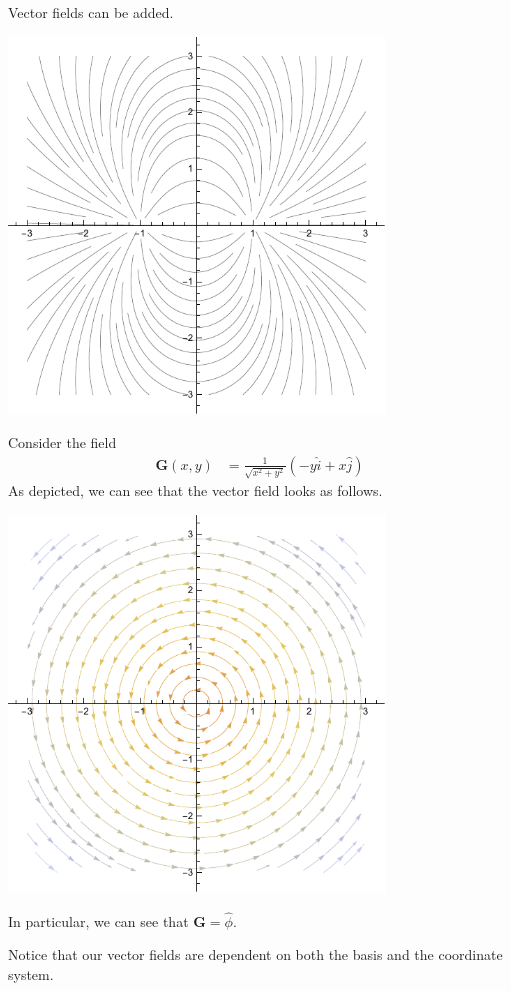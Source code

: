 \documentclass[10pt]{mypackage}
\begin{document}
\begin{example}
  Vector fields can be added.
  \begin{center}
    \includegraphics[width=10cm]{images/dipoles.pdf}
  \end{center}
\end{example}
\begin{example}
  Consider the field
  \begin{align*}
    \mathbf{G}\left(x,y\right) &= \frac{1}{\sqrt{x^2 + y^2}}\left(-y\hat{i} + x\hat{j}\right)
  \end{align*}
  As depicted, we can see that the vector field looks as follows.
  \begin{center}
    \includegraphics[width=10cm]{images/phihat_field.pdf}
  \end{center}
  In particular, we can see that $\mathbf{G} = \hat{\phi}$.
\end{example}
Notice that our vector fields are dependent on both the basis and the coordinate system.\newline
\end{document}
